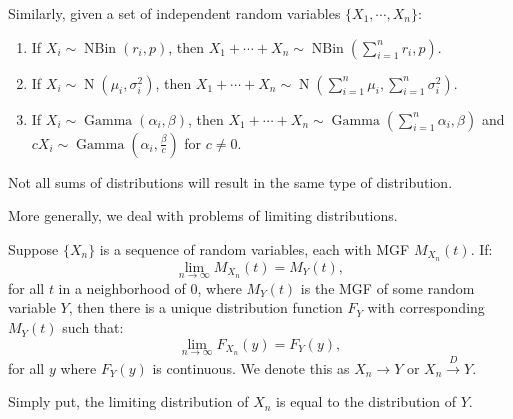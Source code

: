 \documentclass{huhtakm-template-book-v2}
\DeclareMathOperator{\N}{N}
\DeclareMathOperator{\NBin}{NBin}
\DeclareMathOperator{\Gam}{Gamma}
\begin{document}
    \begin{eg}
        Similarly, given a set of independent random variables $\{X_{1}, \cdots, X_{n}\}$:
        \begin{enumerate}
            \item If $X_{i} \sim \NBin(r_{i}, p)$, then $X_{1} + \cdots + X_{n} \sim \NBin\left(\sum_{i=1}^{n} r_{i}, p\right)$.
            \item If $X_{i} \sim \N(\mu_{i}, \sigma_{i}^{2})$, then $X_{1} + \cdots + X_{n} \sim \N\left(\sum_{i=1}^{n} \mu_{i}, \sum_{i=1}^{n} \sigma_{i}^{2}\right)$.
            \item If $X_{i} \sim \Gam(\alpha_{i}, \beta)$, then $X_{1} + \cdots + X_{n} \sim \Gam\left(\sum_{i=1}^{n} \alpha_{i}, \beta\right)$ and $cX_{i} \sim \Gam\left(\alpha_{i}, \frac{\beta}{c}\right)$ for $c \neq 0$.
        \end{enumerate}
    \end{eg}
    \begin{rem}
        Not all sums of distributions will result in the same type of distribution.
    \end{rem}
    More generally, we deal with problems of limiting distributions.
    \begin{thm}
        Suppose $\{X_{n}\}$ is a sequence of random variables, each with MGF $M_{X_{n}}(t)$. If:
        \begin{equation*}
            \lim_{n \to \infty} M_{X_{n}}(t) = M_{Y}(t),
        \end{equation*}
        for all $t$ in a neighborhood of $0$, where $M_{Y}(t)$ is the MGF of some random variable $Y$, then there is a unique distribution function $F_{Y}$ with corresponding $M_{Y}(t)$ such that:
        \begin{equation*}
            \lim_{n \to \infty} F_{X_{n}}(y) = F_{Y}(y),
        \end{equation*}
        for all $y$ where $F_{Y}(y)$ is continuous. We denote this as $X_{n} \to Y$ or $X_{n} \xrightarrow{D} Y$.
    \end{thm}
    \begin{rem}
        Simply put, the limiting distribution of $X_{n}$ is equal to the distribution of $Y$.
    \end{rem}
    \newpage
    
\end{document}
